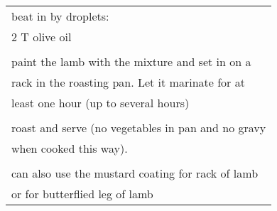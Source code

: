 \documentclass[8pt]{report}
\begin{document}
\begin{tabular}{|l|}
\\
beat in by droplets:\\
\hspace{0.5 in}	2 T olive oil\\
\\
paint the lamb with the mixture and set in on a\\
rack in the roasting pan.  Let it marinate for at\\
least one hour (up to several hours)\\
\\
roast and serve (no vegetables in pan and no gravy\\
when cooked this way).\\
\\
can also use the mustard coating for rack of lamb\\
or for butterflied leg of lamb\\




\hline

\end{tabular}


\newpage

\centering
\end{document}
